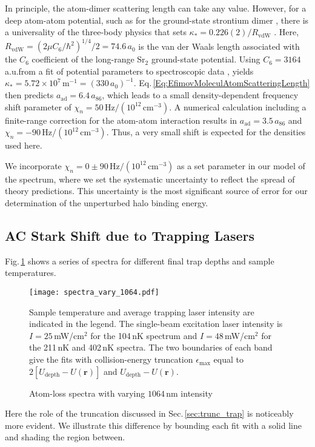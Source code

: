 In principle, the atom-dimer scattering length can take any value.
However, for a deep atom-atom potential, such as for the ground-state strontium dimer \hl{\cite{skt10}}, there is a universality of the three-body physics that sets $\kappa_*=0.226(2)/R_{\mathrm{vdW}}$ \hl{\cite{wie12}}.
Here, $R_{\mathrm{vdW}}=\left({2\mu C_6}/{\hbar^2}\right)^{1/4}/2=74.6$\,$a_0$ is the van der Waals length associated with the $C_6$ coefficient of the long-range Sr$_2$ ground-state potential.
Using $C_6=3164$a.u.\;from a fit of potential parameters to spectroscopic data \hl{\cite{skt10}}, yields $\kappa_*=5.72\times 10^7$\,m$^{-1}=(330\,a_0)^{-1}$.
Eq.\,\ref{Eq:EfimovMoleculAtomScatteringLength} then predicts $a_{\text{ad}}=6.4\, a_{86}$, which leads to a small density-dependent frequency shift parameter of $\chi_n=50\,\mathrm{Hz}/(10^{12}\,\mathrm{cm}^{-3})$.
A numerical calculation including a finite-range correction for the atom-atom interaction \hl{\cite{mwc17}} results in $a_{\text{ad}}=3.5\, a_{86}$ and $\chi_n=-90\,\mathrm{Hz}/(10^{12}\,\mathrm{cm}^{-3})$.
Thus, a very small shift is expected for the densities used here.

We incorporate $\chi_n=0\pm 90 \,\mathrm{Hz}/(10^{12}\,\mathrm{cm}^{-3})$ as a set parameter in our model of the spectrum, where we set the systematic uncertainty to reflect the spread of theory predictions.
This uncertainty is the most significant source of error for our determination of the unperturbed halo binding energy.

\subsection{AC Stark Shift due to Trapping Lasers}
Fig.\,\ref{fig:Spectraminus9MHzVaryTrapCold} shows a series of spectra for different final trap depths and sample temperatures.
	\begin{figure}
	 \centerline{
	 \texttt{[image: spectra\_vary\_1064.pdf]}}
  \caption{Atom-loss spectra with varying $1064$\,nm intensity}{Sample temperature and average trapping laser intensity are indicated in the legend. The single-beam excitation laser intensity is $I=25$\,mW/cm$^{2}$ for the 104\,nK spectrum and $I=48$\,mW/cm$^{2}$ for the 211\,nK and 402\,nK spectra. The two boundaries of each band give the fits with collision-energy truncation
$\epsilon_{\text{max}}$ equal to $2[U_{\text{depth}}-U(\mathbf{r})]$ and $U_{\text{depth}}-U(\mathbf{r})$.}
  	\label{fig:Spectraminus9MHzVaryTrapCold}
	\end{figure}
Here the role of the truncation discussed in Sec.\,\ref{sec:trunc_trap} is noticeably more evident.
We illustrate this difference by bounding each fit with a solid line and shading the region between.

